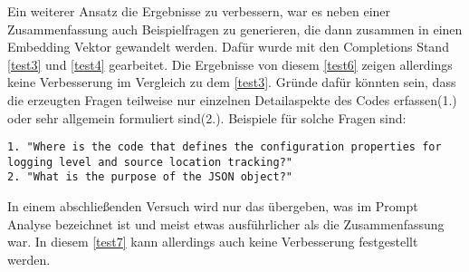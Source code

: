 \documentclass[../main.tex]{subfiles}
\begin{document}
Ein weiterer Ansatz die Ergebnisse zu verbessern, war es neben einer Zusammenfassung auch Beispielfragen zu generieren, die dann zusammen in einen Embedding Vektor gewandelt werden.
Dafür wurde mit den Completions Stand \ref{test3} und \ref{test4} gearbeitet.
Die Ergebnisse von diesem \ref{test6} zeigen allerdings keine Verbesserung im Vergleich zu dem \ref{test3}.
Gründe dafür könnten sein, dass die erzeugten Fragen teilweise nur einzelnen Detailaspekte des Codes erfassen(1.) oder sehr allgemein formuliert sind(2.).
Beispiele für solche Fragen sind:
\begin{center}
\begin{lstlisting}
1. "Where is the code that defines the configuration properties for logging level and source location tracking?"
2. "What is the purpose of the JSON object?"
\end{lstlisting}
\end{center}

In einem abschließenden Versuch wird nur das übergeben, was im Prompt Analyse bezeichnet ist und meist etwas ausführlicher als die Zusammenfassung war. 
In diesem \ref{test7} kann allerdings auch keine Verbesserung festgestellt werden.
\end{document}
